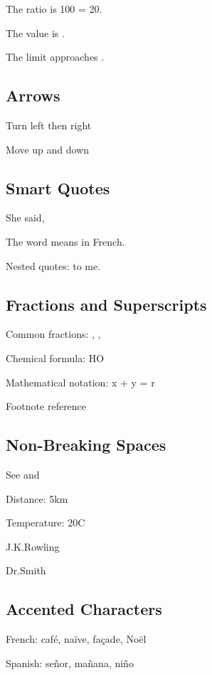 \documentclass[11pt]{article}
\begin{document}
The ratio is 100 = 20.

The value is .

The limit approaches \textinfty.

\subsection{Arrows}

Turn left \larrow then right \rarrow

Move up \uarrow and down \darrow

\subsection{Smart Quotes}

She said, 

The word  means  in French.

Nested quotes:  to me.

\subsection{Fractions and Superscripts}

Common fractions: \half, \quarter, \threequarters

Chemical formula: HO

Mathematical notation: x + y = r

Footnote reference

\subsection{Non-Breaking Spaces}

See  and 

Distance: \unit{5}{km}

Temperature: \unit{20}{\degrees C}

J.\initialspace K.\initialspace Rowling

Dr.\abbrspace Smith

\subsection{Accented Characters}

French: café, naïve, façade, Noël

Spanish: señor, mañana, niño
\end{document}
